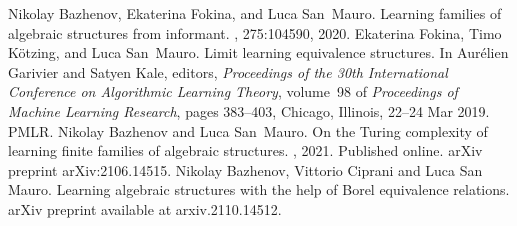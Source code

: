 \documentclass[bsl,meeting]{asl}
\begin{document}
\begin{thebibliography}{10}
Nikolay Bazhenov, Ekaterina Fokina, and Luca San~Mauro.
\newblock Learning families of algebraic structures from informant.
, 275:104590, 2020.
Ekaterina Fokina, Timo K{\"o}tzing, and Luca San~Mauro.
\newblock Limit learning equivalence structures.
\newblock In Aur\'elien Garivier and Satyen Kale, editors, {\em Proceedings of
  the 30th International Conference on Algorithmic Learning Theory}, volume~98
  of {\em Proceedings of Machine Learning Research}, pages 383--403, Chicago,
  Illinois, 22--24 Mar 2019. PMLR.
Nikolay Bazhenov and Luca San~Mauro.
\newblock On the {T}uring complexity of learning finite families of algebraic
  structures.
, 2021.
\newblock Published online. arXiv preprint arXiv:2106.14515.
Nikolay Bazhenov, Vittorio Ciprani and Luca San Mauro.
\newblock Learning algebraic structures with the help of Borel equivalence relations.
\newblock arXiv preprint available at arxiv.2110.14512.


\end{thebibliography}


\vspace*{-0.5\baselineskip}
\end{document}
